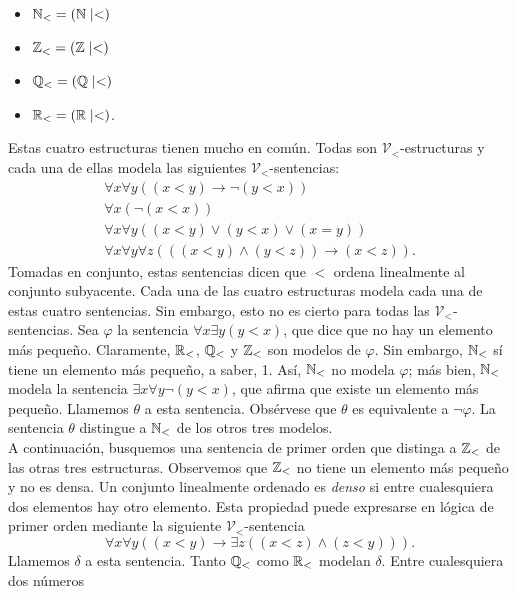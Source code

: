 \message{ !name(main.tex)}\documentclass[12pt,a4paper]{book}
\newcommand{\VV}{\mathcal{V}}
\begin{document}
    \begin{itemize}
        \item[$\bullet$] $\mathbb{N}_{<}=(\mathbb{N}\mid<)$
        \item[$\bullet$] $\mathbb{Z}_{<}=(\mathbb{Z}\mid<)$
        \item[$\bullet$] $\mathbb{Q}_{<}=(\mathbb{Q}\mid<)$
        \item[$\bullet$] $\mathbb{R}_{<}=(\mathbb{R}\mid<)$.
    \end{itemize}

    Estas cuatro estructuras tienen mucho en común. Todas son $\VV_{<}$-estructuras y cada una de ellas modela las
    siguientes $\VV_{<}$-sentencias:
    \begin{gather*}
        \forall x\forall y((x<y)\rightarrow\neg(y<x))\\
        \forall x(\neg(x<x))\\
        \forall x\forall y((x<y)\vee(y<x)\vee(x=y))\\
        \forall x\forall y\forall z(((x<y)\wedge(y<z))\rightarrow(x<z)).
    \end{gather*}
    Tomadas en conjunto, estas sentencias dicen que $<$ ordena linealmente al conjunto subyacente. Cada una de las cuatro
    estructuras modela cada una de estas cuatro sentencias. Sin embargo, esto no es cierto para todas las
    $\VV_{<}$-sentencias. Sea $\varphi$ la sentencia $\forall x\exists y(y<x)$, que dice que no hay un elemento más pequeño.
    Claramente, $\mathbb{R}_{<}$, $\mathbb{Q}_{<}$ y $\mathbb{Z}_{<}$ son modelos de $\varphi$. Sin embargo, $\mathbb{N}_{<}$ sí tiene un elemento más
    pequeño, a saber, 1. Así, $\mathbb{N}_{<}$ no modela $\varphi$; más bien, $\mathbb{N}_{<}$ modela la sentencia
    $\exists x\forall y\neg(y<x)$, que afirma que existe un elemento más pequeño. Llamemos $\theta$ a esta sentencia.
    Obsérvese que $\theta$ es equivalente a $\neg\varphi$. La sentencia $\theta$ distingue a $\mathbb{N}_{<}$ de los otros tres
    modelos.\\
    A continuación, busquemos una sentencia de primer orden que distinga a $\mathbb{Z}_{<}$ de las otras tres estructuras.
    Observemos que $\mathbb{Z}_{<}$ no tiene un elemento más pequeño y no es densa. Un conjunto linealmente ordenado es
    \textit{denso} si entre cualesquiera dos elementos hay otro elemento. Esta propiedad puede expresarse en lógica de
    primer orden mediante la siguiente $\VV_{<}$-sentencia
    \begin{equation*}
        \forall x\forall y((x<y)\rightarrow\exists z((x<z)\wedge(z<y))).
    \end{equation*}
    Llamemos $\delta$ a esta sentencia. Tanto $\mathbb{Q}_{<}$ como $\mathbb{R}_{<}$ modelan $\delta$. Entre cualesquiera dos números
\end{document}
